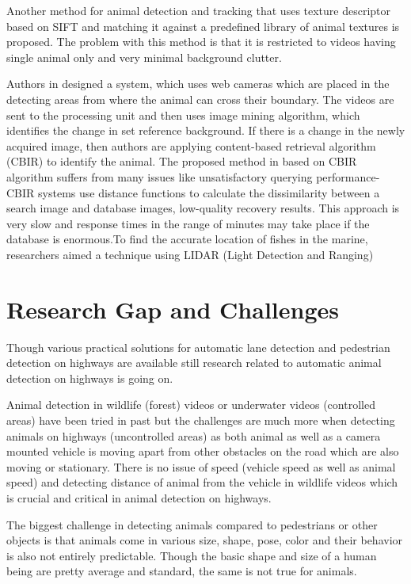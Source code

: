 \documentclass[14pt,a4paper,final]{extreport}
\begin{document}
\newpage \item Another method for animal detection and tracking that uses texture descriptor based on SIFT and matching it against a predefined library of animal textures is proposed. The problem with this method is that it is restricted to videos having single animal only and very minimal background clutter.

 
\item Authors in designed a system, which uses web cameras which are placed in the detecting areas from where the animal can cross their boundary. The videos are sent to the processing unit and then uses image mining algorithm, which identifies the change in set reference background. If there is a change in the newly acquired image, then authors are applying content-based retrieval algorithm (CBIR) to identify the animal. The proposed method in based on CBIR algorithm suffers from many issues like unsatisfactory querying performance-CBIR systems use distance functions to calculate the dissimilarity between a search image and database images, low-quality recovery results. This approach is very slow and response times in the range of minutes may take place if the database is enormous.To find the accurate location of fishes in the marine, researchers aimed a technique using LIDAR (Light Detection and Ranging)
 

\chapter{Research Gap and Challenges}
 
\item Though various practical solutions for automatic lane detection and pedestrian detection on highways are available still research related to automatic animal detection on highways is going on.

\item Animal detection in wildlife (forest) videos or underwater videos (controlled areas) have been tried in past but the challenges are much more when detecting animals on highways (uncontrolled areas) as both animal as well as a camera mounted vehicle is moving apart from other obstacles on the road which are also moving or stationary. There is no issue of speed (vehicle speed as well as animal speed) and detecting distance of animal from the vehicle in wildlife videos which is crucial and critical in animal detection on highways.

\item The biggest challenge in detecting animals compared to pedestrians or other objects is that animals come in various size, shape, pose, color and their behavior is also not entirely predictable. Though the basic shape and size of a human being are pretty average and standard, the same is not true for animals.
\end{document}
